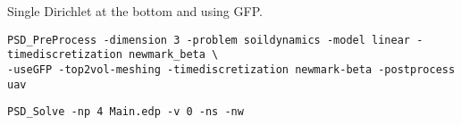 \newcommand{\psd}[1]{{\small\sffamily{\color{blue!60}#1}}}


Single Dirichlet at the bottom and using GFP.

\begin{lstlisting}[style=BashInputStyle]
PSD_PreProcess -dimension 3 -problem soildynamics -model linear -timediscretization newmark_beta \
-useGFP -top2vol-meshing -timediscretization newmark-beta -postprocess uav
\end{lstlisting}

\begin{lstlisting}[style=BashInputStyle]
PSD_Solve -np 4 Main.edp -v 0 -ns -nw 
\end{lstlisting}
